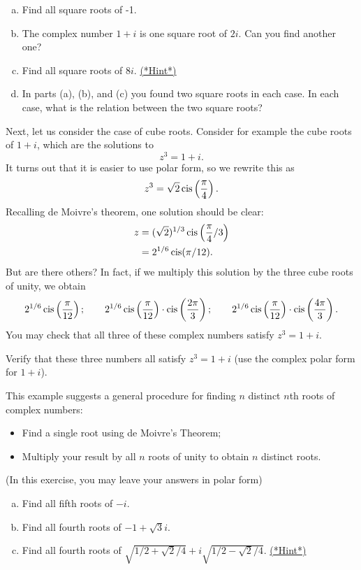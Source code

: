 {\begin{exercise}\label{exercise:complex:58}
\begin{enumerate}[(a)]
\item
Find all square roots of -1.
\item
The complex number $1 + i$ is one square root of $2i$. Can you find another one?
\item
Find all square roots of $8i$.
\hyperref[sec:complex:hints]{(*Hint*)}
\item 
In parts (a), (b), and (c) you found two square roots in each case. In each case, what is the relation between the two square roots?
\end{enumerate}
\end{exercise}
Next, let us consider the case of cube roots. Consider for example the cube roots of $1 + i$, which are the solutions to
\[ z^3 = 1 + i. \]
It turns out that it is easier to use polar form, so we rewrite this as
\[ z^3 = \sqrt{2} \operatorname{cis}\left(\frac{\pi}{4}\right). \]
Recalling de Moivre's theorem, one solution should be clear:
\begin{align*}
z &= (\sqrt{2})^{1/3} \operatorname{cis} \left( \frac{\pi}{4}/3 \right) \\
&= 2^{1/6} \operatorname{cis}(\pi/12).
\end{align*}
But are there others? In fact, if we multiply this solution by the three cube roots of unity, we obtain
\[ 2^{1/6} \operatorname{cis}\left(\frac{\pi}{12}\right); \qquad 2^{1/6} \operatorname{cis}\left(\frac{\pi}{12}\right) \cdot \operatorname{cis}\left(\frac{2\pi}{3}\right); \qquad 2^{1/6} \operatorname{cis}\left(\frac{\pi}{12}\right) \cdot \operatorname{cis}\left(\frac{4\pi}{3}\right). \]
You may check that all three of these complex numbers satisfy $z^3 = 1 + i$.

\begin{exercise}\label{exercise:complex:59}
Verify that these three numbers all satisfy $z^3 = 1 + i$ (use the complex polar form for $1 + i$).
\end{exercise}
This example suggests a general procedure for finding $n$ distinct $n$th roots of complex numbers:
\begin{itemize}
\item Find a single root using de Moivre's Theorem;
\item Multiply your result by all $n$ roots of unity to obtain $n$ distinct roots.
\end{itemize}

\begin{exercise}\label{exercise:complex:60}
(In this exercise, you may leave your answers in polar form)
\begin{enumerate}[(a)]
\item
Find all fifth roots of $-i$.
\item
Find all fourth roots of $-1 + \sqrt{3}i$.
\item
Find all fourth roots of $ \sqrt{1/2 + \sqrt{2}/4} + i\sqrt{1/2 - \sqrt{2}/4}$. 
\hyperref[sec:complex:hints]{(*Hint*)}
\end{enumerate}
\end{exercise}


}
